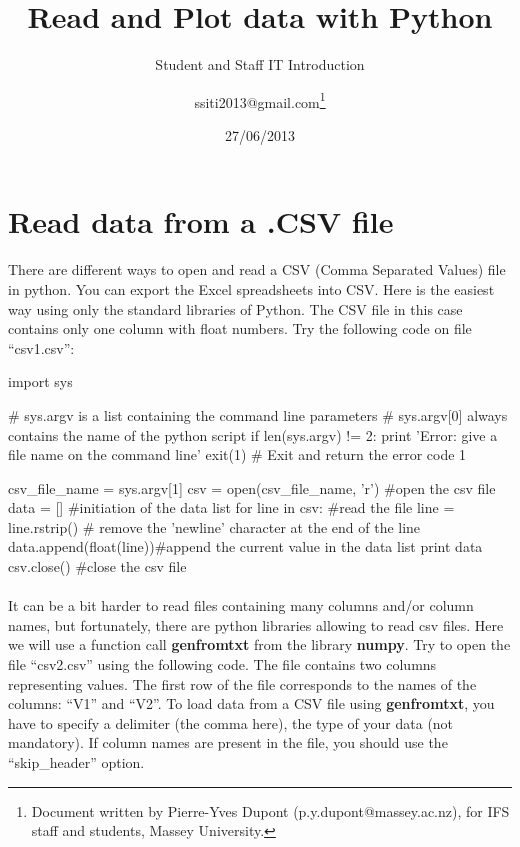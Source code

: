 \documentclass[article,10pt]{scrartcl}
\begin{document}
\title{Read and Plot data with Python}
\subtitle{Student and Staff IT Introduction}
\date{27/06/2013}
\author{ssiti2013@gmail.com\footnote{Document written by Pierre-Yves Dupont (p.y.dupont@massey.ac.nz), for IFS staff and students, Massey University.}}
\maketitle

\section{Read data from a .CSV file}

\paragraph{}
There are different ways to open and read a CSV (Comma Separated Values) file in python. You can export the Excel spreadsheets into CSV. Here is the easiest way using only the standard libraries of Python.
The CSV file in this case contains only one column with float numbers. Try the following code on file ``csv1.csv'':

\begin{python}
import sys

# sys.argv is a list containing the command line parameters
# sys.argv[0] always contains the name of the python script
if len(sys.argv) != 2:
   print 'Error: give a file name on the command line'
   exit(1) # Exit and return the error code 1

csv_file_name = sys.argv[1]
csv = open(csv_file_name, 'r') #open the csv file
data = [] #initiation of the data list
for line in csv: #read the file
   line = line.rstrip() # remove the 'newline' character at the end of the line
   data.append(float(line))#append the current value in the data list
print data
csv.close() #close the csv file
\end{python}

\paragraph{}
It can be a bit harder to read files containing many columns and/or column names, but fortunately, there are python libraries allowing to read csv files. Here we will use a function call \textbf{genfromtxt} from the library \textbf{numpy}. Try to open the file ``csv2.csv'' using the following code. The file contains two columns representing values. The first row of the file corresponds to the names of the columns: ``V1'' and ``V2''. To load data from a CSV file using \textbf{genfromtxt}, you have to specify a delimiter (the comma here), the type of your data (not mandatory). If column names are present in the file, you should use the ``skip\_header'' option.
\end{document}

